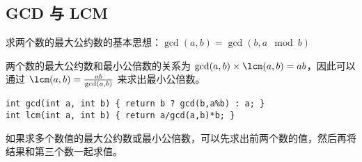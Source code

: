 \subsection{GCD 与 LCM}
	求两个数的最大公约数的基本思想：$\gcd(a,b)=\gcd(b,a\mod {}b)$
	
	两个数的最大公约数和最小公倍数的关系为 $\gcd(a,b)\times \lcm(a,b)=ab$，因此可以通过 $\lcm(a,b)={\frac  {ab}{\gcd(a,b)}}$ 来求出最小公倍数。
	
\begin{lstlisting}
int gcd(int a, int b) { return b ? gcd(b,a%b) : a; }
int lcm(int a, int b) { return a/gcd(a,b)*b; }
\end{lstlisting}
	
	如果求多个数值的最大公约数或最小公倍数，可以先求出前两个数的值，然后再将结果和第三个数一起求值。